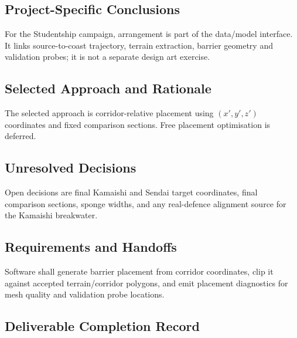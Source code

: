 \subsection{Project-Specific Conclusions}
\label{sec:res-geo-arr-conclusions}

For the Studentship campaign, arrangement is part of the data/model
interface. It links source-to-coast trajectory, terrain extraction,
barrier geometry and validation probes; it is not a separate design
art exercise.

\subsection{Selected Approach and Rationale}
\label{sec:res-geo-arr-selected-approach}

The selected approach is corridor-relative placement using
$(x',y',z')$ coordinates and fixed comparison sections. Free placement
optimisation is deferred.

\subsection{Unresolved Decisions}
\label{sec:res-geo-arr-unresolved-decisions}

Open decisions are final Kamaishi and Sendai target coordinates, final
comparison sections, sponge widths, and any real-defence alignment
source for the Kamaishi breakwater.

\subsection{Requirements and Handoffs}
\label{sec:res-geo-arr-requirements}

Software shall generate barrier placement from corridor coordinates,
clip it against accepted terrain/corridor polygons, and emit placement
diagnostics for mesh quality and validation probe locations.

\subsection{Deliverable Completion Record}
\label{sec:res-geo-arr-completion-record}

%
%
%
